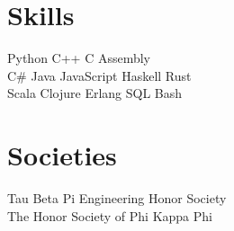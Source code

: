 \documentclass[]{deedy-resume-openfont-rileyannis}
\begin{document}
\begin{minipage}[t]{0.33\textwidth}

\section{Skills}
Python \textbullet{} C++ \textbullet{} C \textbullet{} Assembly\\
C\# \textbullet{} Java \textbullet{} JavaScript \textbullet{} Haskell \textbullet{} Rust\\
Scala \textbullet{} Clojure \textbullet{} Erlang \textbullet{} SQL \textbullet{} Bash\\
\sectionsep


\section{Societies} 
Tau Beta Pi Engineering Honor Society\\
The Honor Society of Phi Kappa Phi\\
\sectionsep


%
%

\end{minipage} 
\hfill
\end{document}
